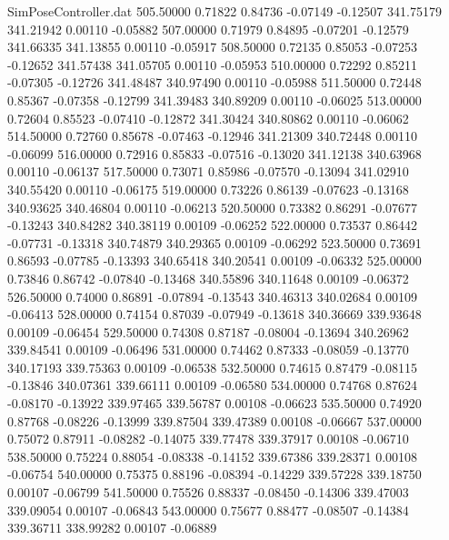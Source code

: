 \begin{filecontents}{SimPoseController.dat}
 505.50000    0.71822    0.84736    -0.07149   -0.12507  341.75179  341.21942    0.00110   -0.05882
 507.00000    0.71979    0.84895    -0.07201   -0.12579  341.66335  341.13855    0.00110   -0.05917
 508.50000    0.72135    0.85053    -0.07253   -0.12652  341.57438  341.05705    0.00110   -0.05953
 510.00000    0.72292    0.85211    -0.07305   -0.12726  341.48487  340.97490    0.00110   -0.05988
 511.50000    0.72448    0.85367    -0.07358   -0.12799  341.39483  340.89209    0.00110   -0.06025
 513.00000    0.72604    0.85523    -0.07410   -0.12872  341.30424  340.80862    0.00110   -0.06062
 514.50000    0.72760    0.85678    -0.07463   -0.12946  341.21309  340.72448    0.00110   -0.06099
 516.00000    0.72916    0.85833    -0.07516   -0.13020  341.12138  340.63968    0.00110   -0.06137
 517.50000    0.73071    0.85986    -0.07570   -0.13094  341.02910  340.55420    0.00110   -0.06175
 519.00000    0.73226    0.86139    -0.07623   -0.13168  340.93625  340.46804    0.00110   -0.06213
 520.50000    0.73382    0.86291    -0.07677   -0.13243  340.84282  340.38119    0.00109   -0.06252
 522.00000    0.73537    0.86442    -0.07731   -0.13318  340.74879  340.29365    0.00109   -0.06292
 523.50000    0.73691    0.86593    -0.07785   -0.13393  340.65418  340.20541    0.00109   -0.06332
 525.00000    0.73846    0.86742    -0.07840   -0.13468  340.55896  340.11648    0.00109   -0.06372
 526.50000    0.74000    0.86891    -0.07894   -0.13543  340.46313  340.02684    0.00109   -0.06413
 528.00000    0.74154    0.87039    -0.07949   -0.13618  340.36669  339.93648    0.00109   -0.06454
 529.50000    0.74308    0.87187    -0.08004   -0.13694  340.26962  339.84541    0.00109   -0.06496
 531.00000    0.74462    0.87333    -0.08059   -0.13770  340.17193  339.75363    0.00109   -0.06538
 532.50000    0.74615    0.87479    -0.08115   -0.13846  340.07361  339.66111    0.00109   -0.06580
 534.00000    0.74768    0.87624    -0.08170   -0.13922  339.97465  339.56787    0.00108   -0.06623
 535.50000    0.74920    0.87768    -0.08226   -0.13999  339.87504  339.47389    0.00108   -0.06667
 537.00000    0.75072    0.87911    -0.08282   -0.14075  339.77478  339.37917    0.00108   -0.06710
 538.50000    0.75224    0.88054    -0.08338   -0.14152  339.67386  339.28371    0.00108   -0.06754
 540.00000    0.75375    0.88196    -0.08394   -0.14229  339.57228  339.18750    0.00107   -0.06799
 541.50000    0.75526    0.88337    -0.08450   -0.14306  339.47003  339.09054    0.00107   -0.06843
 543.00000    0.75677    0.88477    -0.08507   -0.14384  339.36711  338.99282    0.00107   -0.06889

\end{filecontents}

